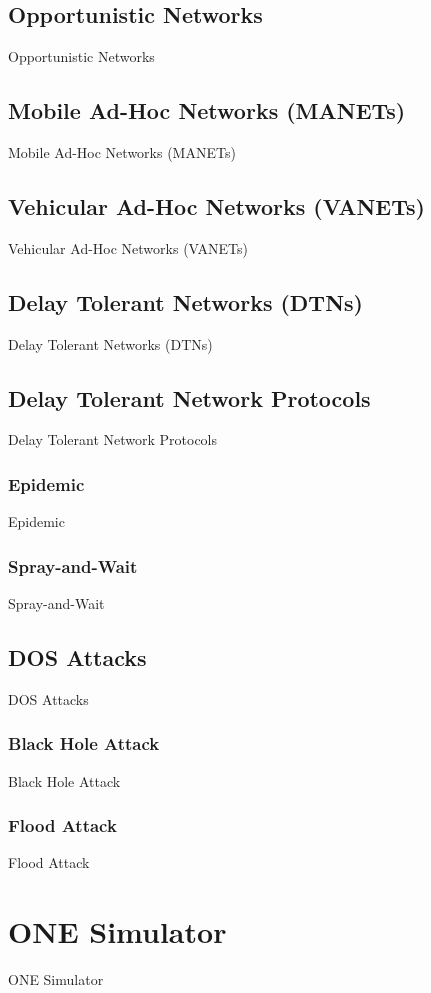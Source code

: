 \documentclass{article}
\begin{document}
\subsection{Opportunistic Networks}
Opportunistic Networks

\subsection{Mobile Ad-Hoc Networks (MANETs)}
Mobile Ad-Hoc Networks (MANETs)

\subsection{Vehicular Ad-Hoc Networks (VANETs)}
Vehicular Ad-Hoc Networks (VANETs)

\subsection{Delay Tolerant Networks (DTNs)}
Delay Tolerant Networks (DTNs)

\subsection{Delay Tolerant Network Protocols}
Delay Tolerant Network Protocols

\subsubsection{Epidemic}
Epidemic

\subsubsection{Spray-and-Wait}
Spray-and-Wait

\subsection{DOS Attacks}
DOS Attacks

\subsubsection{Black Hole Attack}
Black Hole Attack

\subsubsection{Flood Attack}
Flood Attack

\section{ONE Simulator}
ONE Simulator
\end{document}
